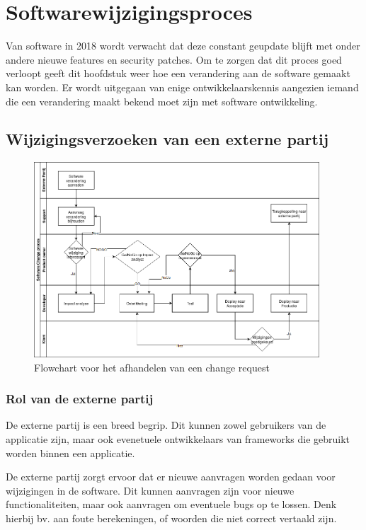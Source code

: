 \chapter{Softwarewijzigingsproces}
Van software in 2018 wordt verwacht dat deze constant geupdate blijft met onder andere nieuwe features en security patches.
Om te zorgen dat dit proces goed verloopt geeft dit hoofdstuk weer hoe een verandering aan de software gemaakt kan worden.
Er wordt uitgegaan van enige ontwikkelaarskennis aangezien iemand die een verandering maakt bekend moet zijn met software ontwikkeling.

\section{Wijzigingsverzoeken van een externe partij}
\begin{figure}[H]
	\centering
	\includegraphics[width=0.95\textwidth]{images/ChangeRequest.png}
	\caption{Flowchart voor het afhandelen van een change request}
	\label{fig:ChangeRequest}
\end{figure}

\subsection{Rol van de externe partij}
De externe partij is een breed begrip. Dit kunnen zowel gebruikers van de applicatie zijn, maar ook evenetuele ontwikkelaars van frameworks die gebruikt worden binnen een applicatie.

De externe partij zorgt ervoor dat er nieuwe aanvragen worden gedaan voor wijzigingen in de software. Dit kunnen aanvragen zijn voor nieuwe functionaliteiten, maar ook aanvragen om eventuele bugs op te lossen. Denk hierbij bv. aan foute berekeningen, of woorden die niet correct vertaald zijn.

